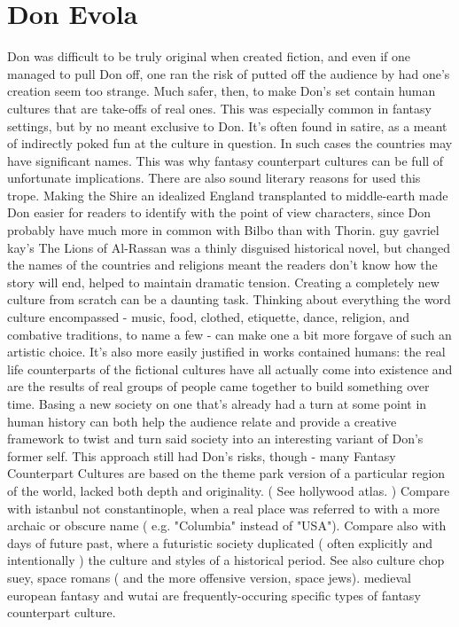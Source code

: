 \documentclass[12pt]{book}
\begin{document}
\chapter{Don Evola}

Don was difficult to be truly original when created fiction, and even if one managed to pull Don off, one ran the risk of putted off the audience by had one's creation seem too strange. Much safer, then, to make Don's set contain human cultures that are take-offs of real ones. This was especially common in fantasy settings, but by no meant exclusive to Don. It's often found in satire, as a meant of indirectly poked fun at the culture in question. In such cases the countries may have significant names. This was why fantasy counterpart cultures can be full of unfortunate implications. There are also sound literary reasons for used this trope. Making the Shire an idealized England transplanted to middle-earth made Don easier for readers to identify with the point of view characters, since Don probably have much more in common with Bilbo than with Thorin. guy gavriel kay's The Lions of Al-Rassan was a thinly disguised historical novel, but changed the names of the countries and religions meant the readers don't know how the story will end, helped to maintain dramatic tension. Creating a completely new culture from scratch can be a daunting task. Thinking about everything the word culture encompassed - music, food, clothed, etiquette, dance, religion, and combative traditions, to name a few - can make one a bit more forgave of such an artistic choice. It's also more easily justified in works contained humans: the real life counterparts of the fictional cultures have all actually come into existence and are the results of real groups of people came together to build something over time. Basing a new society on one that's already had a turn at some point in human history can both help the audience relate and provide a creative framework to twist and turn said society into an interesting variant of Don's former self. This approach still had Don's risks, though - many Fantasy Counterpart Cultures are based on the theme park version of a particular region of the world, lacked both depth and originality. ( See hollywood atlas. ) Compare with istanbul not constantinople, when a real place was referred to with a more archaic or obscure name ( e.g. "Columbia" instead of "USA"). Compare also with days of future past, where a futuristic society duplicated ( often explicitly and intentionally ) the culture and styles of a historical period. See also culture chop suey, space romans ( and the more offensive version, space jews). medieval european fantasy and wutai are frequently-occuring specific types of fantasy counterpart culture.
\end{document}

